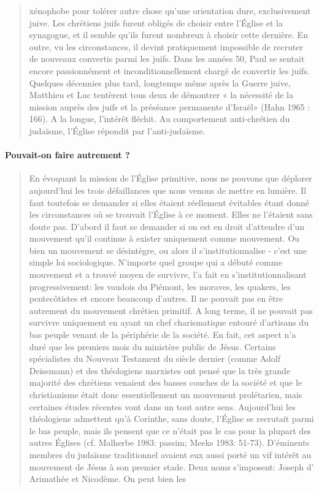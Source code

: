 \begin{quote}
    xénophobe pour tolérer autre chose qu'une orientation dure,
exclusivement juive. Les chrétiens juifs furent obligés de choisir entre
l'Église et la synagogue, et il semble qu'ils furent nombreux à choisir
cette dernière. En outre, vu les circonstances, il devint pratiquement
impossible de recruter de nouveaux convertis parmi les juifs.
Dans les années 50, Paul se sentait encore passionnément et
inconditionnellement chargé de convertir les juifs. Quelques décennies
plus tard, longtemps même après la Guerre juive, Matthieu et Luc
tentèrent tous deux de démontrer « la nécessité de la mission auprès
des juifs et la préséance permanente d'Israël» (Hahn 1965 : 166). A
la longue, l'intérêt fléchit. Au comportement anti-chrétien du
judaïsme, l'Église répondit par l'anti-judaïsme.
\end{quote}

\paragraph{Pouvait-on faire autrement ?}

\begin{quote}
    En évoquant la mission de l'Église primitive, nous ne pouvons que
déplorer aujourd'hui les trois défaillances que nous venons de mettre
en lumière. Il faut toutefois se demander si elles étaient réellement
évitables étant donné les circonstances où se trouvait l'Église à ce
moment. Elles ne l'étaient sans doute pas.
D'abord il faut se demander si on est en droit d'attendre d'un
mouvement qu'il continue à exister uniquement comme mouvement.
Ou bien un mouvement se désintègre, ou alors il s'institutionnalise -
c'est une simple loi sociologique. N'importe quel groupe qui a débuté
comme mouvement et a trouvé moyen de survivre, l'a fait en
s'institutionnalisant progressivement: les vaudois du Piémont, les
moraves, les quakers, les pentecôtistes et encore beaucoup d'autres. Il
ne pouvait pas en être autrement du mouvement chrétien primitif. A
long terme, il ne pouvait pas survivre uniquement en ayant un chef
charismatique entouré d'artisans du bas peuple venant de la périphérie
de la société. En fait, cet aspect n'a duré que les premiers mois du
ministère public de Jésus. Certains spécialistes du Nouveau Testament
du siècle dernier (comme Adolf Deissmann) et des théologiens
marxistes ont pensé que la très grande majorité des chrétiens venaient
des basses couches de la société et que le christianisme était donc
essentiellement un mouvement prolétarien, mais certaines études
récentes vont dans un tout autre sens. Aujourd'hui les théologiens
admettent qu'à Corinthe, sans doute, l'Église se recrutait parmi le bas
peuple, mais ils pensent que ce n'était pas le cas pour la plupart des
autres Églises (cf. Malherbe 1983: passim; Meeks 1983: 51-73).
D'éminents membres du judaïsme traditionnel avaient eux aussi
porté un vif intérêt au mouvement de Jésus à son premier stade. Deux
noms s'imposent: Joseph d' Arimathée et Nicodème. On peut bien les
\end{quote}

